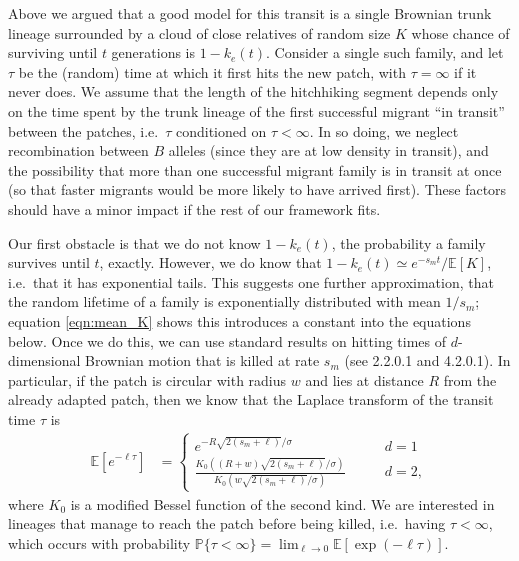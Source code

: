 \documentclass{article}
\newcommand{\linelabel}[1]{}
\newcommand{\citet}[1]{\cite{#1}}
\renewcommand{\P}{\mathbb{P}}
\newcommand{\E}{\mathbb{E}}
\begin{document}
Above we argued that a good model for this transit is a single Brownian trunk lineage
surrounded by a cloud of close relatives of random size $K$
whose chance of surviving until $t$ generations is $1-k_e(t)$.
Consider a single such family, and let $\tau$ be the (random) time at which it first hits the new patch,
with $\tau = \infty$ if it never does. 
We assume that the length of the hitchhiking segment depends only on 
the time spent by the trunk lineage of the first successful migrant ``in transit'' between the patches,
i.e.\ $\tau$ conditioned on $\tau < \infty$.
In so doing, we neglect 
recombination between $B$ alleles (since they are at low density in transit),
and the possibility that more than one successful migrant family is in transit at once
(so that faster migrants would be more likely to have arrived first).
These factors should have a minor impact if the rest of our framework fits.

Our first obstacle is that we do not know $1-k_e(t)$, 
the probability a family survives until $t$, exactly.
However, we do know that $1-k_e(t) \simeq e^{-s_m t} / \E[K]$,
i.e.\ that it has exponential tails.
This suggests one further approximation, 
that the random lifetime of a family is exponentially distributed with mean $1/s_m$;
equation \eqref{eqn:mean_K} shows this introduces a constant into the equations below. \linelabel{rr:EK}
Once we do this, 
we can use standard results on hitting times of $d$-dimensional Brownian motion
that is killed at rate $s_m$ (see \citet{borodin2002handbook} 2.2.0.1 and 4.2.0.1).
In particular, if the patch is circular with radius $w$ and lies at distance
$R$ from the already adapted patch, then 
we know that the Laplace transform of the transit time $\tau$ is
\begin{align}
  \E[e^{-\ell \tau}] &=
    \begin{cases}
      e^{- R \sqrt{2(s_m+\ell)}/\sigma} \qquad & d=1 \\
      \frac{ K_0( (R+w)\sqrt{2(s_m+\ell)}/\sigma) }{ K_0( w\sqrt{2(s_m+\ell)}/\sigma) } \qquad & d=2  ,
    \end{cases} \label{eqn:borodinresult}
\end{align}
where $K_0$ is a modified Bessel function of the second kind.
We are interested in lineages that manage to reach the patch before being killed,
i.e.\ having $\tau < \infty$,
which occurs with probability
$\P\{\tau < \infty\} = \lim_{\ell \to 0} \E \left[\exp(-\ell \tau) \right]$. 
\end{document}

